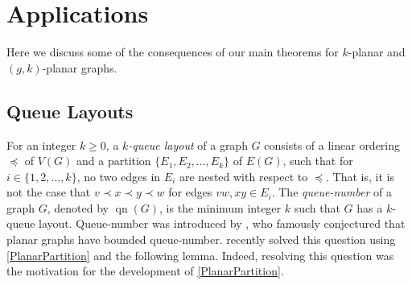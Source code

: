 \documentclass{patmorin}
\DeclareMathOperator{\dist}{dist}
\DeclareMathOperator{\tw}{tw}
\DeclareMathOperator{\qn}{qn}
\DeclarePairedDelimiter{\floor}{\lfloor}{\rfloor}
\renewcommand{\le}{\leqslant}
\renewcommand{\geq}{\geqslant}
\begin{document}
% 
% 
% 

\section{Applications}
\label{Applications}

Here we discuss some of the consequences of our main theorems for $k$-planar and $(g,k)$-planar graphs. 

\subsection{Queue Layouts}

For an integer $k\geq 0$, a \textit{$k$-queue layout} of a graph $G$ consists of a linear ordering $\preceq$ of $V(G)$ and a partition $\{E_1,E_2,\dots,E_k\}$ of $E(G)$, such that for $i\in\{1,2,\dots,k\}$, no two edges in $E_i$ are nested with respect to $\preceq$. That is, it is not the case that $v\prec x \prec y \prec w$ for edges $vw,xy\in E_i$. The \textit{queue-number} of a graph $G$, denoted by $\qn(G)$, is the minimum integer $k$ such that $G$ has a $k$-queue layout. Queue-number was introduced by \citet{HLR92}, who famously conjectured that planar graphs have bounded queue-number. \citet{dujmovic.joret.ea:planar} recently solved this question using \cref{PlanarPartition} and the following lemma. Indeed, resolving this question was the motivation for the development of \cref{PlanarPartition}.
\end{document}
